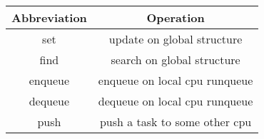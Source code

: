 \centering
\small
\renewcommand{\arraystretch}{1.5}
\begin{tabular}{|c|c|}
  \hline \textbf{Abbreviation}& \textbf{Operation}\\[5pt]
  \hline set                  & update on global structure\\
  \hline find                 & search on global structure\\
  \hline enqueue              & enqueue on local cpu runqueue\\
  \hline dequeue              & dequeue on local cpu runqueue\\
  \hline push                 & push a task to some other cpu \\ \hline
\end{tabular}

